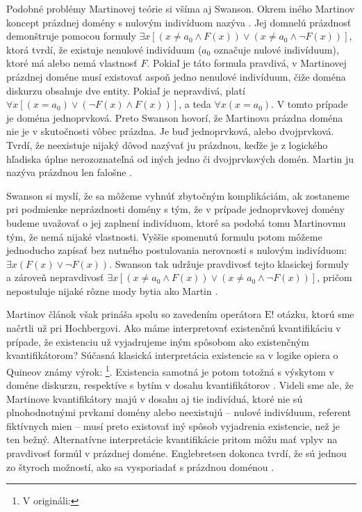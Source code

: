 \documentclass[12pt, letterpaper]{article}
\begin{document}
Podobné problémy Martinovej teórie si všíma aj Swanson. Okrem iného Martinov koncept prázdnej domény s nulovým indivíduom nazýva \parencites[774]{Swanson}. Jej domnelú prázdnosť demonštruje pomocou formuly $\exists x [(x\neq a_0 \land F(x)) \lor (x \neq a_0 \land \neg F(x))]$, ktorá tvrdí, že existuje nenulové indivíduum ($a_0$ označuje nulové indivíduum), ktoré má alebo nemá vlastnosť $F$. Pokiaľ je táto formula pravdivá, v Martinovej prázdnej doméne musí existovať aspoň jedno nenulové indivíduum, čiže doména diskurzu obsahuje dve entity. Pokiaľ je nepravdivá, platí $\forall x [(x=a_0) \lor (\neg F(x) \land F(x))]$, a teda $\forall x (x=a_0)$. V tomto prípade je doména jednoprvková. Preto Swanson hovorí, že Martinova prázdna doména nie je v skutočnosti vôbec prázdna. Je buď jednoprvková, alebo dvojprvková. Tvrdí, že neexistuje nijaký dôvod nazývať ju prázdnou, keďže je z logického hľadiska úplne nerozoznateľná od iných jedno či dvojprvkových domén. Martin ju nazýva prázdnou len falošne \parencites[774]{Swanson}.\par 
Swanson si myslí, že sa môžeme vyhnúť zbytočným komplikáciám, ak zostaneme pri podmienke neprázdnosti domény s tým, že v prípade jednoprvkovej domény budeme uvažovať o jej zaplnení indivíduom, ktoré sa podobá tomu Martinovmu tým, že nemá nijaké vlastnosti. Vyššie spomenutú formulu potom môžeme jednoducho zapísať bez nutného postulovania nerovnosti s nulovým indivíduom: $\exists x (F(x) \lor \neg F(x))$. Swanson tak udržuje pravdivosť tejto klasickej formuly a zároveň nepravdivosť  $\exists x [(x\neq a_0 \land F(x)) \lor (x \neq a_0 \land \neg F(x))]$, pričom nepostuluje nijaké rôzne mody bytia ako Martin \parencites[774--775]{Swanson}.\par  
Martinov článok však prináša spolu so zavedením operátora $\text{E}!$ otázku, ktorú sme načrtli už pri Hochbergovi. Ako máme interpretovať existenčnú kvantifikáciu v prípade, že existenciu už vyjadrujeme iným spôsobom ako existenčným kvantifikátorom? Súčasná klasická interpretácia existencie sa v logike opiera o Quineov známy výrok: \footnote{V origináli: }\parencites[vlastný preklad,][32]{quineThere}. Existencia samotná je potom totožná s výskytom v doméne diskurzu, respektíve s bytím v dosahu kvantifikátorov \parencites[96]{peregrin_filosofie_2017}. Videli sme ale, že Martinove kvantifikátory majú v dosahu aj tie indivíduá, ktoré nie sú plnohodnotnými prvkami domény alebo neexistujú -- nulové indivíduum, referent fiktívnych mien -- musí preto existovať iný spôsob vyjadrenia existencie, než je ten bežný. Alternatívne interpretácie kvantifikácie pritom môžu mať vplyv na pravdivosť formúl v prázdnej doméne. Englebretsen dokonca tvrdí, že sú jednou zo štyroch možností, ako sa vysporiadať s prázdnou doménou \parencites[352]{englebretsen}.\par
\end{document}
